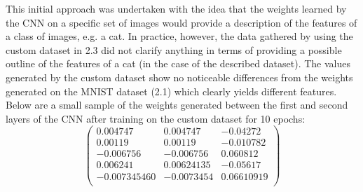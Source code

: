 \documentclass[12pt, titlepage]{article}
\begin{document}
This initial approach was undertaken with the idea that the weights learned by the CNN on a specific set of
images would provide a description of the features of a class of images, e.g. a cat. In practice, however, the
data gathered by using the custom dataset in 2.3 did not clarify anything in terms of providing a possible
outline of the features of a cat (in the case of the described dataset). The values generated by the custom dataset
show no noticeable differences from the weights generated on the MNIST dataset (2.1) which clearly yields
different features. Below are a small sample of the weights generated between the first and second layers of the CNN
after training on the custom dataset for 10 epochs: \\

\[\left( \begin{array}{ccc}
0.004747 & 0.004747 & -0.04272\\
0.00119 & 0.00119 & -0.010782\\
-0.006756 & -0.006756 & 0.060812\\
0.006241 & 0.00624135 & -0.05617\\
-0.007345460 & -0.0073454 & 0.06610919\\
\end{array} \right) \]
\vspace{2mm}
\end{document}
